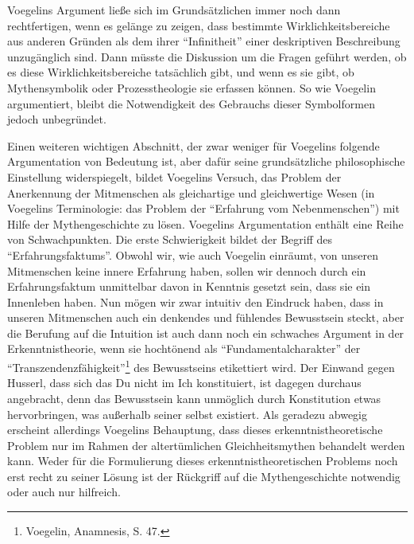 Voegelins Argument ließe sich im Grundsätzlichen immer noch dann
rechtfertigen, wenn es gelänge zu zeigen, dass bestimmte Wirklichkeitsbereiche
aus anderen Gründen als dem ihrer "`Infinitheit"' einer deskriptiven
Beschreibung unzugänglich sind. Dann müsste die Diskussion um die Fragen
geführt werden, ob es diese Wirklichkeitsbereiche tatsächlich gibt, und wenn
es sie gibt, ob Mythensymbolik oder Prozesstheologie sie erfassen können. So
wie Voegelin argumentiert, bleibt die Notwendigkeit des Gebrauchs dieser
Symbolformen jedoch unbegründet.

Einen weiteren wichtigen Abschnitt, der zwar weniger für Voegelins folgende
Argumentation von Bedeutung ist, aber dafür seine grundsätzliche
philosophische Einstellung widerspiegelt, bildet Voegelins Versuch, das
Problem der Anerkennung der Mitmenschen als gleichartige und gleichwertige
Wesen (in Voegelins Terminologie: das Problem der "`Erfahrung vom
Nebenmenschen"') mit Hilfe der Mythengeschichte zu lösen. Voegelins
Argumentation enthält eine Reihe von Schwachpunkten. Die erste Schwierigkeit
bildet der Begriff des "`Erfahrungsfaktums"'. Obwohl wir, wie auch Voegelin
einräumt, von unseren Mitmenschen keine innere Erfahrung haben, sollen wir
dennoch durch ein Erfahrungsfaktum unmittelbar davon in Kenntnis gesetzt sein,
dass sie ein Innenleben haben. Nun mögen wir zwar intuitiv den Eindruck haben,
dass in unseren Mitmenschen auch ein denkendes und fühlendes Bewusstsein
steckt, aber die Berufung auf die Intuition ist auch dann noch ein schwaches
Argument in der Erkenntnistheorie, wenn sie hochtönend als
"`Fundamentalcharakter"' der "`Transzendenzfähigkeit"'\footnote{Voegelin,
  Anamnesis, S. 47.} des Bewusstseins etikettiert wird. Der Einwand gegen
Husserl, dass sich das Du nicht im Ich konstituiert, ist dagegen durchaus
angebracht, denn das Bewusstsein kann unmöglich durch Konstitution etwas
hervorbringen, was außerhalb seiner selbst existiert. Als geradezu abwegig
erscheint allerdings Voegelins Behauptung, dass dieses erkenntnistheoretische
Problem nur im Rahmen der altertümlichen Gleichheitsmythen behandelt werden
kann. Weder für die Formulierung dieses erkenntnistheoretischen Problems noch
erst recht zu seiner Lösung ist der Rückgriff auf die Mythengeschichte
notwendig oder auch nur hilfreich.

